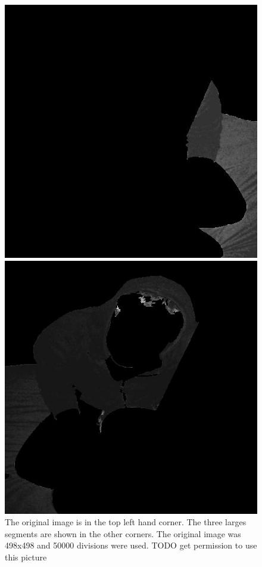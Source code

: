 \begin{figure}[ht]
\begin{minipage}[b]{0.47\linewidth}
\end{minipage}
\begin{minipage}[b]{0.47\linewidth}
\centering
\includegraphics[width=\textwidth]{MSTseg3.jpg}
\end{minipage}
\hspace{0.5cm}
\begin{minipage}[b]{0.47\linewidth}
\centering
\includegraphics[width=\textwidth]{MSTseg4.jpg}
\end{minipage}
\caption{The original image is in the top left hand corner. The three larges segments are shown in the other corners. The original image was 498x498 and 50000 divisions were used. TODO get permission to use this picture}
\end{figure}
\vfill

